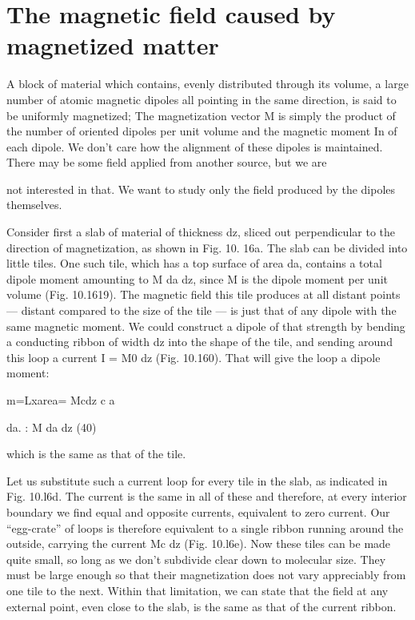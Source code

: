 \iffalse

\section{The magnetic field caused by magnetized matter}

A block of material which contains, evenly distributed through its
volume, a large number of atomic magnetic dipoles all pointing in
the same direction, is said to be uniformly magnetized; The magnetization
vector M is simply the product of the number of oriented
dipoles per unit volume and the magnetic moment In of each dipole.
We don't care how the alignment of these dipoles is maintained.
There may be some field applied from another source, but we are

not interested in that. We want to study only the field produced
by the dipoles themselves.

Consider first a slab of material of thickness dz, sliced out perpendicular
to the direction of magnetization, as shown in Fig. 10. 16a.
The slab can be divided into little tiles. One such tile, which has a
top surface of area da, contains a total dipole moment amounting to
M da dz, since M is the dipole moment per unit volume (Fig. 10.1619).
The magnetic field this tile produces at all distant points --- distant
compared to the size of the tile --- is just that of any dipole with the
same magnetic moment. We could construct a dipole of that
strength by bending a conducting ribbon of width dz into the shape
of the tile, and sending around this loop a current I = M0 dz (Fig.
10.160). That will give the loop a dipole moment:
\begin{equation}
\end{equation}

m=Lxarea= Mcdz
c a

da. : M da dz (40)

which is the same as that of the tile.

Let us substitute such a current loop for every tile in the slab, as
indicated in Fig. 10.l6d. The current is the same in all of these and
therefore, at every interior boundary we find equal and opposite
currents, equivalent to zero current. Our ``egg-crate'' of loops is
therefore equivalent to a single ribbon running around the outside,
carrying the current Mc dz (Fig. 10.l6e). Now these tiles can be
made quite small, so long as we don't subdivide clear down to molecular
size. They must be large enough so that their magnetization
does not vary appreciably from one tile to the next. Within that
limitation, we can state that the field at any external point, even close
to the slab, is the same as that of the current ribbon.

